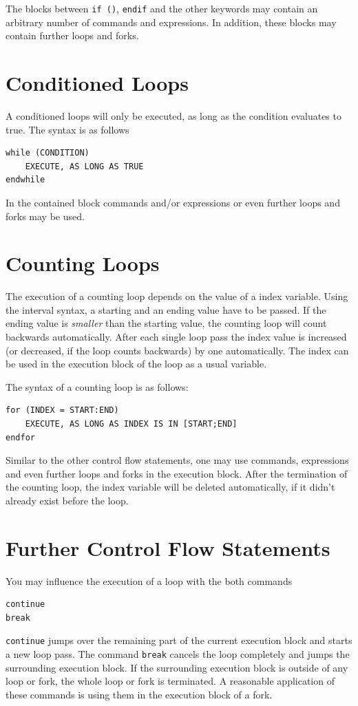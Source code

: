 \documentclass[DIV=14,headsepline,footsepline]{scrbook}
\begin{document}
				The blocks between \verb+if ()+, \verb+endif+ and the other keywords may contain an arbitrary number of commands and expressions. In addition, these blocks may contain further loops and forks.
				
			\section{Conditioned Loops}
				A conditioned loops will only be executed, as long as the condition evaluates to true. The syntax is as follows
				\begin{lstlisting}
while (CONDITION)
	EXECUTE, AS LONG AS TRUE
endwhile
				\end{lstlisting}
				In the contained block commands and/or expressions or even further loops and forks may be used.
				
			\section{Counting Loops}
				The execution of a counting loop depends on the value of a index variable. Using the interval syntax, a starting and an ending value have to be passed. If the ending value is \emph{smaller} than the starting value, the counting loop will count backwards automatically. After each single loop pass the index value is increased (or decreased, if the loop counts backwards) by one automatically. The index can be used in the execution block of the loop as a usual variable.
				
				The syntax of a counting loop is as follows:
				\begin{lstlisting}
for (INDEX = START:END)
	EXECUTE, AS LONG AS INDEX IS IN [START;END]
endfor
				\end{lstlisting}
				Similar to the other control flow statements, one may use commands, expressions and even further loops and forks in the execution block. After the termination of the counting loop, the index variable will be deleted automatically, if it didn't already exist before the loop.
				
			\section{Further Control Flow Statements}
				You may influence the execution of a loop with the both commands
				\begin{lstlisting}
continue
break
				\end{lstlisting}
				\verb+continue+ jumps over the remaining part of the current execution block and starts a new loop pass. The command \verb+break+ cancels the loop completely and jumps the surrounding execution block. If the surrounding execution block is outside of any loop or fork, the whole loop or fork is terminated. A reasonable application of these commands is using them in the execution block of a fork.
				
\end{document}
